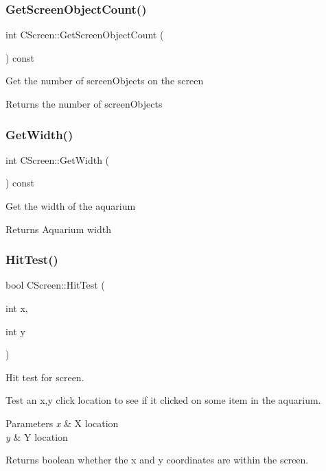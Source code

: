 \subsubsection{\texorpdfstring{GetScreenObjectCount()}{GetScreenObjectCount()}}
{\footnotesize\ttfamily int C\+Screen\+::\+Get\+Screen\+Object\+Count (\begin{DoxyParamCaption}{ }\end{DoxyParamCaption}) const\hspace{0.3cm}{\ttfamily [inline]}}

Get the number of screen\+Objects on the screen \begin{DoxyReturn}{Returns}
the number of screen\+Objects 
\end{DoxyReturn}
\mbox{\label{class_c_screen_a592f32768220e63f75608945acd04751}} 
\subsubsection{\texorpdfstring{GetWidth()}{GetWidth()}}
{\footnotesize\ttfamily int C\+Screen\+::\+Get\+Width (\begin{DoxyParamCaption}{ }\end{DoxyParamCaption}) const\hspace{0.3cm}{\ttfamily [inline]}}

Get the width of the aquarium \begin{DoxyReturn}{Returns}
Aquarium width 
\end{DoxyReturn}
\mbox{\label{class_c_screen_aede27a1651d308fa5c75d62266146225}} 
\subsubsection{\texorpdfstring{HitTest()}{HitTest()}}
{\footnotesize\ttfamily bool C\+Screen\+::\+Hit\+Test (\begin{DoxyParamCaption}\item[{int}]{x,  }\item[{int}]{y }\end{DoxyParamCaption})}



Hit test for screen. 

Test an x,y click location to see if it clicked on some item in the aquarium. 
\begin{DoxyParams}{Parameters}
{\em x} & X location \\
\hline
{\em y} & Y location \\
\hline
\end{DoxyParams}
\begin{DoxyReturn}{Returns}
boolean whether the x and y coordinates are within the screen. 
\end{DoxyReturn}
\mbox{\label{class_c_screen_a5418c3a3041dfbd8afad9ddb28ad5cd8}} 
